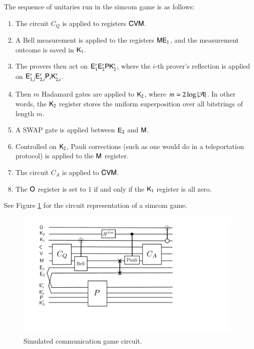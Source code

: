 \medskip
\noindent The sequence of unitaries run in the simcom game is as follows:
\begin{enumerate}
	\item The circuit $C_Q$ is applied to registers ${\mathsf{C}} {\mathsf{V}} {\mathsf{M}}$.
	\item A Bell measurement is applied to the registers ${\mathsf{M}} {\mathsf{E}}_1$, and the measurement outcome is saved in ${\mathsf{K}}_1$.
	\item The provers then act on ${\mathsf{E}}_1' {\mathsf{E}}_2' {\mathsf{P}} {\mathsf{K}}_2'$, where the $i$-th prover's reflection is applied on ${\mathsf{E}}_{1,i}' {\mathsf{E}}_{2,i}' {\mathsf{P}}_i {\mathsf{K}}_{2,i}'$.
	\item Then $m$ Hadamard gates are applied to ${\mathsf{K}}_2$, where $m = 2\log |\mathcal A|$. In other words, the ${\mathsf{K}}_2$ register stores the uniform superposition over all bitstrings of length $m$.
	\item A SWAP gate is applied between ${\mathsf{E}}_2$ and ${\mathsf{M}}$.
	\item Controlled on ${\mathsf{K}}_2$, Pauli corrections (such as one would do in a teleportation protocol) is applied to the ${\mathsf{M}}$ register.
	\item The circuit $C_A$ is applied to ${\mathsf{C}} {\mathsf{V}} {\mathsf{M}}$.
	\item The ${\mathsf{O}}$ register is set to $1$ if and only if the ${\mathsf{K}}_1$ register is all zero. 
\end{enumerate}

\noindent See Figure \ref{fig:simcom} for the circuit representation of a simcom game.

\begin{figure}[H]
\begin{center}
\includegraphics[width=5in]{graphics/simcom.pdf}
\end{center}
\caption{Simulated communication game circuit.}
\label{fig:simcom}
\end{figure}

